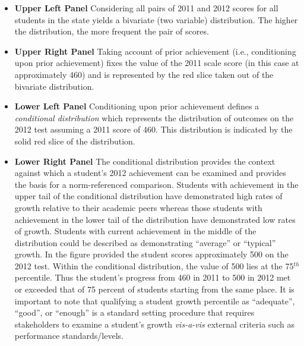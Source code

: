 \documentclass[12pt]{article}
\begin{document}
\begin{itemize}
\itemsep1pt\parskip0pt
\item
  \textbf{Upper Left Panel} Considering all pairs of 2011 and 2012
  scores for all students in the state yields a bivariate (two variable)
  distribution. The higher the distribution, the more frequent the pair
  of scores.\\
\item
  \textbf{Upper Right Panel} Taking account of prior achievement (i.e.,
  conditioning upon prior achievement) fixes the value of the 2011 scale
  score (in this case at approximately 460) and is represented by the
  red slice taken out of the bivariate distribution.
\item
  \textbf{Lower Left Panel} Conditioning upon prior achievement defines
  a \emph{conditional distribution} which represents the distribution of
  outcomes on the 2012 test assuming a 2011 score of 460. This
  distribution is indicated by the solid red slice of the
  distribution.\\
\item
  \textbf{Lower Right Panel} The conditional distribution provides the
  context against which a student's 2012 achievement can be examined and
  provides the basis for a norm-referenced comparison. Students with
  achievement in the upper tail of the conditional distribution have
  demonstrated high rates of growth relative to their academic peers
  whereas those students with achievement in the lower tail of the
  distribution have demonstrated low rates of growth. Students with
  current achievement in the middle of the distribution could be
  described as demonstrating ``average'' or ``typical'' growth. In the
  figure provided the student scores approximately 500 on the 2012 test.
  Within the conditional distribution, the value of 500 lies at the
  75\(^{th}\) percentile. Thus the student's progress from 460 in 2011
  to 500 in 2012 met or exceeded that of 75 percent of students starting
  from the same place. It is important to note that qualifying a student
  growth percentile as ``adequate'', ``good'', or ``enough'' is a
  standard setting procedure that requires stakeholders to examine a
  student's growth \emph{vis-a-vis} external criteria such as
  performance standards/levels.
\end{itemize}

\pagebreak
\end{document}
